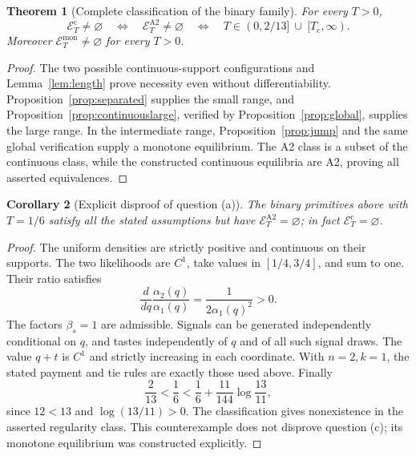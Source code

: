 \documentclass[11pt,a4paper]{article}
\newtheorem{theorem}{Theorem}[section]
\newtheorem{corollary}[theorem]{Corollary}
\theoremstyle{remark}\newtheorem{remark}[theorem]{Remark}
\begin{document}
\begin{theorem}[Complete classification of the binary family]\label{thm:classification}
For every $T>0$,
\[
 \mathcal E_T^{\mathrm c}\ne\varnothing
 \quad\Longleftrightarrow\quad
 \mathcal E_T^{\mathrm{A2}}\ne\varnothing
 \quad\Longleftrightarrow\quad
 T\in(0,2/13]\ \cup\ [T_c,\infty).
\]
Moreover $\mathcal E_T^{\mathrm{mon}}\ne\varnothing$ for every $T>0$.
\end{theorem}
\begin{proof}
The two possible continuous-support configurations and Lemma~\ref{lem:length} prove necessity even without differentiability. Proposition~\ref{prop:separated} supplies the small range, and Proposition~\ref{prop:continuouslarge}, verified by Proposition~\ref{prop:global}, supplies the large range. In the intermediate range, Proposition~\ref{prop:jump} and the same global verification supply a monotone equilibrium. The A2 class is a subset of the continuous class, while the constructed continuous equilibria are A2, proving all asserted equivalences.
\end{proof}

\begin{corollary}[Explicit disproof of question (a)]\label{cor:auctioncounter}
The binary primitives above with $T=1/6$ satisfy all the stated assumptions but have $\mathcal E_T^{\mathrm{A2}}=\varnothing$; in fact $\mathcal E_T^{\mathrm c}=\varnothing$.
\end{corollary}
\begin{proof}
The uniform densities are strictly positive and continuous on their supports. The two likelihoods are $C^1$, take values in $[1/4,3/4]$, and sum to one. Their ratio satisfies
\[
 \frac{d}{dq}\frac{\alpha_2(q)}{\alpha_1(q)}
  =\frac{1}{2\alpha_1(q)^2}>0.
\]
The factors $\beta_s=1$ are admissible. Signals can be generated independently conditional on $q$, and tastes independently of $q$ and of all such signal draws. The value $q+t$ is $C^1$ and strictly increasing in each coordinate. With $n=2,k=1$, the stated payment and tie rules are exactly those used above. Finally
\[
 \frac2{13}<\frac16<\frac16+\frac{11}{144}\log\frac{13}{11},
\]
since $12<13$ and $\log(13/11)>0$. The classification gives nonexistence in the asserted regularity class. This counterexample does not disprove question (c); its monotone equilibrium was constructed explicitly.
\end{proof}
\end{document}
